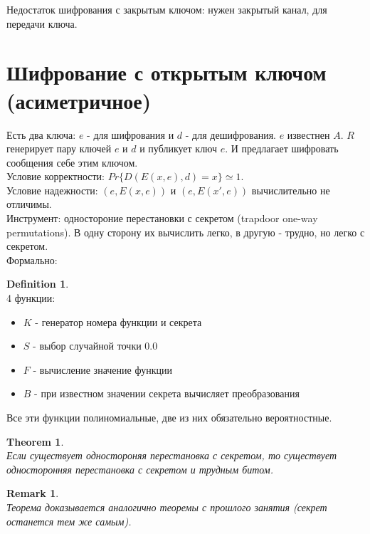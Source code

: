 \documentclass[a4paper]{article}
\theoremstyle{definition}
\newtheorem{definition}{Definition}
\theoremstyle{plain}
\newtheorem{theorem}{Theorem}
\newtheorem{remark}{Remark}
\begin{document}
\noindent Недостаток шифрования с закрытым ключом: нужен закрытый канал, для передачи ключа.

\section{Шифрование с открытым ключом~\\(асиметричное)}

\noindent Есть два ключа: $e$ - для шифрования и $d$ - для дешифрования. $e$ известнен $A$.
$R$ генерирует пару ключей $e$ и $d$ и публикует ключ $e$. И предлагает шифровать сообщения себе этим
ключом.~\\

\noindent Условие корректности: $Pr\{D(E(x, e), d) = x\} \simeq 1$.~\\
Условие надежности: $(e, E(x, e))$ и $(e, E(x', e))$ вычислительно не отличимы.~\\

\noindent Инструмент: одностороние перестановки с секретом (trapdoor one-way permutations).
В одну сторону их вычислить легко, в другую - трудно, но легко с секретом.~\\

\noindent Формально:
\begin{definition}~\\
	4 функции:
	\begin{itemize}
		\item $K$ - генератор номера функции и секрета
		\item $S$ - выбор случайной точки $0.0$
		\item $F$ - вычисление значение функции
		\item $B$ - при известном значении секрета вычисляет преобразования
	\end{itemize}
	Все эти функции полиномиальные, две из них обязательно вероятностные.
\end{definition}

\begin{theorem}~\\
	Если существует одностороняя перестановка с секретом, то существует односторонняя перестановка
	с секретом и трудным битом.
\end{theorem}

\begin{remark}~\\
	Теорема доказывается аналогично теоремы с прошлого занятия (секрет останется тем же самым).
\end{remark}
\end{document}
